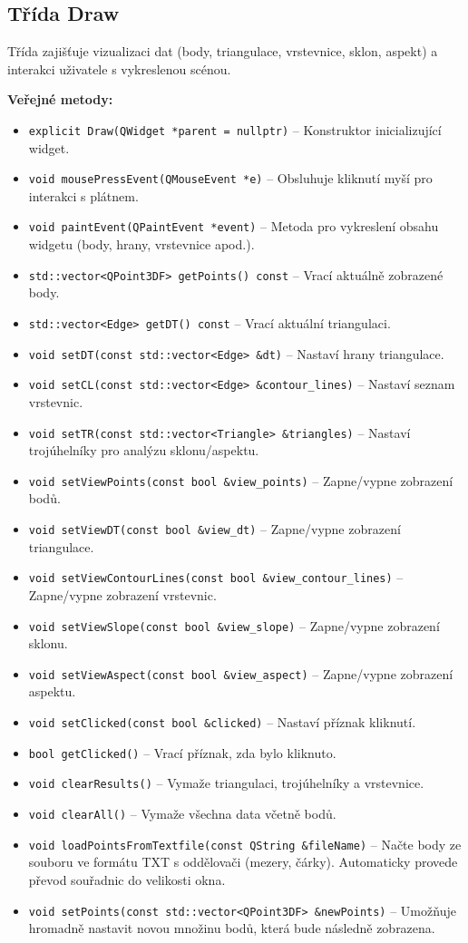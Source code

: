\subsection{Třída Draw}
Třída zajišťuje vizualizaci dat (body, triangulace, vrstevnice, sklon, aspekt) a interakci uživatele s vykreslenou scénou.

\textbf{Veřejné metody:}
\begin{itemize}
\item \texttt{explicit Draw(QWidget *parent = nullptr)} – Konstruktor inicializující widget.
\item \texttt{void mousePressEvent(QMouseEvent *e)} – Obsluhuje kliknutí myší pro interakci s plátnem.
\item \texttt{void paintEvent(QPaintEvent *event)} – Metoda pro vykreslení obsahu widgetu (body, hrany, vrstevnice apod.).
\item \texttt{std::vector<QPoint3DF> getPoints() const} – Vrací aktuálně zobrazené body.
\item \texttt{std::vector<Edge> getDT() const} – Vrací aktuální triangulaci.
\item \texttt{void setDT(const std::vector<Edge> \&dt)} – Nastaví hrany triangulace.
\item \texttt{void setCL(const std::vector<Edge> \&contour\_lines)} – Nastaví seznam vrstevnic.
\item \texttt{void setTR(const std::vector<Triangle> \&triangles)} – Nastaví trojúhelníky pro analýzu sklonu/aspektu.
\item \texttt{void setViewPoints(const bool \&view\_points)} – Zapne/vypne zobrazení bodů.
\item \texttt{void setViewDT(const bool \&view\_dt)} – Zapne/vypne zobrazení triangulace.
\item \texttt{void setViewContourLines(const bool \&view\_contour\_lines)} – Zapne/vypne zobrazení vrstevnic.
\item \texttt{void setViewSlope(const bool \&view\_slope)} – Zapne/vypne zobrazení sklonu.
\item \texttt{void setViewAspect(const bool \&view\_aspect)} – Zapne/vypne zobrazení aspektu.
\item \texttt{void setClicked(const bool \&clicked)} – Nastaví příznak kliknutí.
\item \texttt{bool getClicked()} – Vrací příznak, zda bylo kliknuto.
\item \texttt{void clearResults()} – Vymaže triangulaci, trojúhelníky a vrstevnice.
\item \texttt{void clearAll()} – Vymaže všechna data včetně bodů.
\item \texttt{void loadPointsFromTextfile(const QString \&fileName)} – Načte body ze souboru ve formátu TXT s oddělovači (mezery, čárky). Automaticky provede převod souřadnic do velikosti okna.
\item \texttt{void setPoints(const std::vector<QPoint3DF> \&newPoints)} – Umožňuje hromadně nastavit novou množinu bodů, která bude následně zobrazena.

\end{itemize}


